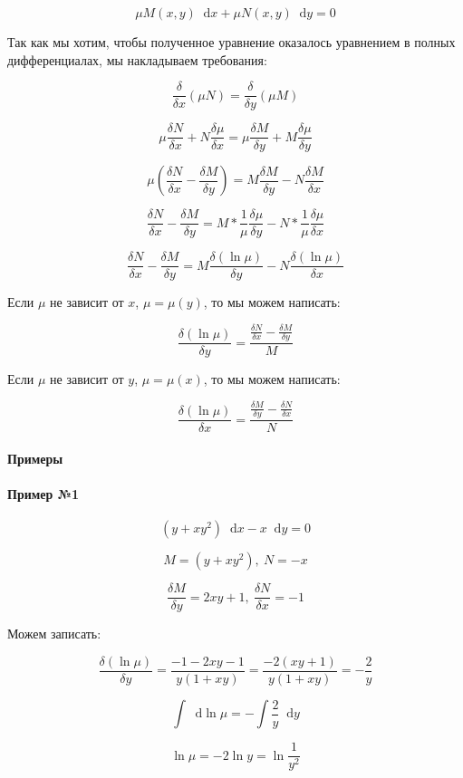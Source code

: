 \documentclass{article}
\newcommand*\diff{\mathop{}\!\mathrm{d}}
\begin{document}
$$\mu M(x, y) \diff x + \mu N(x, y) \diff y = 0$$

Так как мы хотим, чтобы полученное уравнение оказалось уравнением в полных дифференциалах, мы накладываем требования:

$$\frac{\delta}{\delta x} (\mu N) = \frac{\delta}{\delta y} (\mu M)$$


$$\mu \frac{\delta N}{\delta x} + N \frac{\delta \mu}{\delta x} = \mu \frac{\delta M}{\delta y} + M \frac{\delta \mu}{\delta y}$$

$$\mu (\frac{\delta N}{\delta x} - \frac{\delta M}{\delta y}) = M \frac{\delta M}{\delta y} - N \frac{\delta M}{\delta x}$$

$$\frac{\delta N}{\delta x} - \frac{\delta M}{\delta y} = M * \frac{1}{\mu} \frac{\delta \mu}{\delta y} - N * \frac{1}{\mu} \frac{\delta \mu}{\delta x}$$

$$\frac{\delta N}{\delta x} - \frac{\delta M}{\delta y} = M \frac{\delta (\ln \mu)}{\delta y} - N \frac{\delta (\ln \mu)}{\delta x}$$

Если $\mu$ не зависит от $x$, $\mu = \mu (y)$, то мы можем написать:

$$\frac{\delta (\ln \mu)}{\delta y} = \frac{\frac{\delta N}{\delta x} - \frac{\delta M}{\delta y}}{M}$$

Если $\mu$ не зависит от $y$, $\mu = \mu (x)$, то мы можем написать:


$$\frac{\delta (\ln \mu)}{\delta x} = \frac{\frac{\delta M}{\delta y} - \frac{\delta N}{\delta x}}{N}$$

\paragraph{Примеры}

\paragraph{Пример №1}

$$(y + xy^2) \diff x - x \diff y = 0$$

$$M = (y +xy^2), \ N = -x$$

$$\frac{\delta M}{\delta y} = 2xy + 1, \ \frac{\delta N}{\delta x} = -1$$

Можем записать:

$$\frac{\delta (\ln \mu)}{\delta y} = \frac{-1 - 2xy - 1}{y(1 + xy)} = \frac{-2(xy + 1)}{y (1 + xy)} = -\frac{2}{y}$$


$$\int \diff \ln \mu = - \int \frac{2}{y} \diff y$$

$$\ln \mu = -2 \ln y = \ln \frac{1}{y^2}$$
\end{document}
